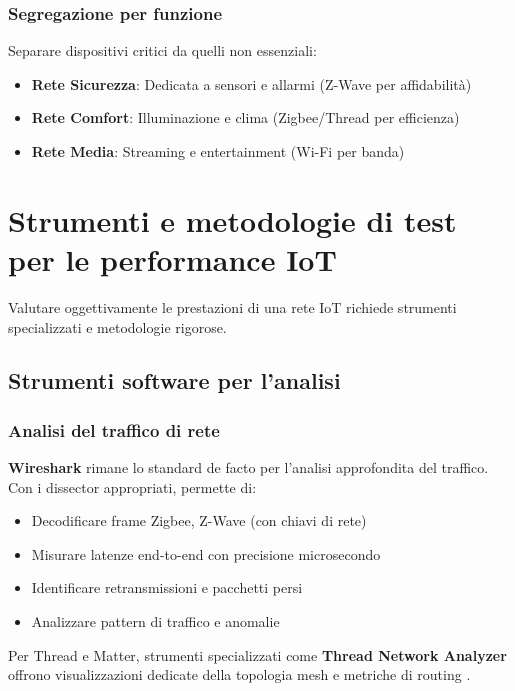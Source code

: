 \subsubsection{Segregazione per funzione}

Separare dispositivi critici da quelli non essenziali:

\begin{itemize}
    \item \textbf{Rete Sicurezza}: Dedicata a sensori e allarmi (Z-Wave per affidabilità)
    \item \textbf{Rete Comfort}: Illuminazione e clima (Zigbee/Thread per efficienza)
    \item \textbf{Rete Media}: Streaming e entertainment (Wi-Fi per banda)
\end{itemize}

\section{Strumenti e metodologie di test per le performance IoT}

Valutare oggettivamente le prestazioni di una rete IoT richiede strumenti specializzati e metodologie rigorose.

\subsection{Strumenti software per l'analisi}

\subsubsection{Analisi del traffico di rete}

\textbf{Wireshark} rimane lo standard de facto per l'analisi approfondita del traffico. Con i dissector appropriati, permette di:
\begin{itemize}
    \item Decodificare frame Zigbee, Z-Wave (con chiavi di rete)
    \item Misurare latenze end-to-end con precisione microsecondo
    \item Identificare retransmissioni e pacchetti persi
    \item Analizzare pattern di traffico e anomalie
\end{itemize}

Per Thread e Matter, strumenti specializzati come \textbf{Thread Network Analyzer} offrono visualizzazioni dedicate della topologia mesh e metriche di routing \cite{WiresharkTool}.

